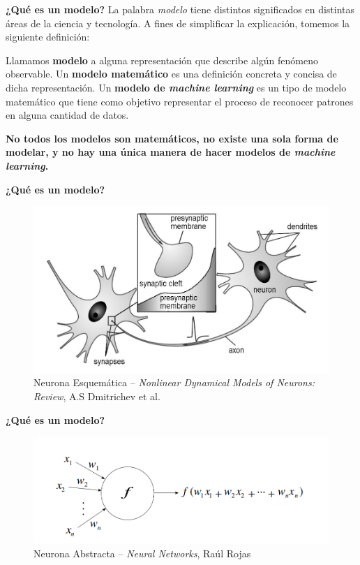 \documentclass{beamer}
\begin{document}
\begin{frame}{\textbf{¿Qué es un modelo?}}
    La palabra \textit{modelo} tiene distintos significados en distintas áreas de la ciencia y tecnología. A fines de simplificar la explicación, tomemos la siguiente definición:\par\vspace{1mm}
    \centering
    \begin{tcolorbox}[width=0.8\textwidth]
    \raggedright
    Llamamos \textbf{modelo} a alguna representación que describe algún fenómeno observable. Un \textbf{modelo matemático} es una definición concreta y concisa de dicha representación. Un \textbf{modelo de \textit{machine learning}} es un tipo de modelo matemático que tiene como objetivo representar el proceso de reconocer patrones en alguna cantidad de datos.
  \end{tcolorbox}
  \pause
  \textbf{No todos los modelos son matemáticos, no existe una sola forma de modelar, y no hay una única manera de hacer modelos de \textit{machine learning}.}
\end{frame}

\begin{frame}{\textbf{¿Qué es un modelo?}}

    \begin{figure}
        \centering
        \includegraphics[width=0.75\linewidth]{neurona-esquematica.png}
        \captionsetup{labelformat=empty}
        \caption{Neurona Esquemática -- \textit{Nonlinear Dynamical Models of Neurons: Review}, A.S Dmitrichev et al.}
    \end{figure}
\end{frame}

\begin{frame}{\bfseries ¿Qué es un modelo?}
    \begin{figure}
        \centering
        \includegraphics[width=0.75\linewidth]{perceptron.png}
        \captionsetup{labelformat=empty}
        \caption{Neurona Abstracta -- \textit{Neural Networks}, Raúl Rojas}
    \end{figure}
\end{frame}
\end{document}
